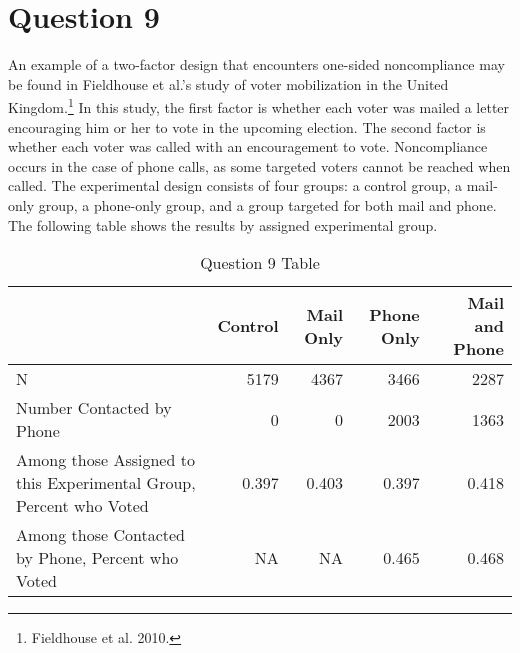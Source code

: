 \documentclass[11pt,notitlepage]{article}\usepackage[]{graphicx}\usepackage[]{color}
\begin{document}
\begin{enumerate}[a)]
\end{enumerate}
\section*{Question 9}
An example of a two-factor design that encounters one-sided noncompliance may be found in Fieldhouse et al.'s study of voter mobilization in the United Kingdom.\footnote{Fieldhouse et al. 2010.} In this study, the first factor is whether each voter was mailed a letter encouraging him or her to vote in the upcoming election. The second factor is whether each voter was called with an encouragement to vote. Noncompliance occurs in the case of phone calls, as some targeted voters cannot be reached when called. The experimental design consists of four groups: a control group, a mail-only group, a phone-only group, and a group targeted for both mail and phone. The following table shows the results by assigned experimental group.
\begin{table}[htbp]
  \centering
  \caption{Question 9 Table}
    \begin{tabular}{R{5cm}rrrr}
    \toprule
          & Control  & Mail Only  & Phone Only  & Mail and Phone  \\
    \midrule
    N     & 5179  & 4367  & 3466  & 2287 \\
    Number Contacted by Phone  & 0     & 0     & 2003  & 1363 \\
    Among those Assigned to this Experimental Group, Percent who Voted  & 0.397 & 0.403 & 0.397 & 0.418 \\
    Among those Contacted by Phone, Percent who Voted  & NA    & NA    & 0.465 & 0.468 \\
    \bottomrule
    \end{tabular}%
  \label{tab:addlabel}%
\end{table}%
\end{document}
